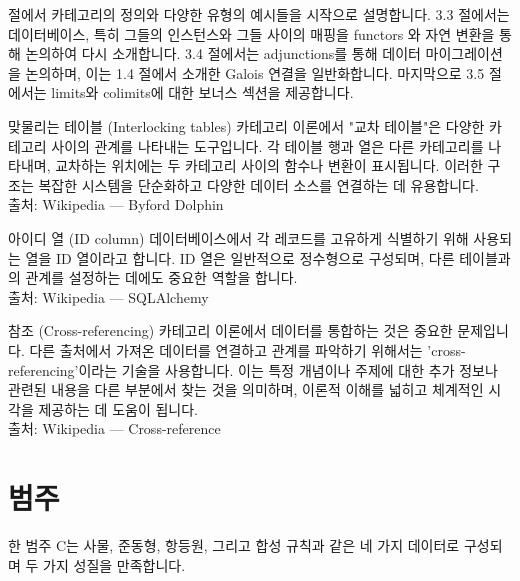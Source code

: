 \documentclass[11pt, a4paper, twoside, openany]{book}
\begin{document}
{\par{} 절에서 카테고리의 정의와 다양한 유형의 예시들을 시작으로 설명합니다. 3.3 절에서는 데이터베이스, 특히 그들의 인스턴스와 그들 사이의 매핑을 functors 와 자연 변환을 통해 논의하여 다시 소개합니다. 3.4 절에서는 adjunctions\hspace{0pt}를 통해 데이터 마이그레이션을 논의하며, 이는 1.4 절에서 소개한 Galois 연결을 일반화합니다. 마지막으로 3.5 절에서는 limits\hspace{0pt}와 colimits\hspace{0pt}에 대한 보너스 섹션을 제공합니다.

\begin{deepresearch}{맞물리는 테이블 (Interlocking tables)}
카테고리 이론에서 "교차 테이블"은 다양한 카테고리 사이의 관계를 나타내는 도구입니다. 각 테이블 행과 열은 다른 카테고리를 나타내며, 교차하는 위치에는 두 카테고리 사이의 함수나 변환이 표시됩니다. 이러한 구조는 복잡한 시스템을 단순화하고 다양한 데이터 소스를 연결하는 데 유용합니다.
\\[4pt]{\footnotesize\color{ctgray} 출처: Wikipedia — Byford Dolphin}
\end{deepresearch}

\begin{deepresearch}{아이디 열 (ID column)}
데이터베이스에서 각 레코드를 고유하게 식별하기 위해 사용되는 열을 ID 열이라고 합니다.  ID 열은 일반적으로 정수형으로 구성되며, 다른 테이블과의 관계를 설정하는 데에도 중요한 역할을 합니다.
\\[4pt]{\footnotesize\color{ctgray} 출처: Wikipedia — SQLAlchemy}
\end{deepresearch}

\begin{deepresearch}{참조 (Cross-referencing)}
카테고리 이론에서 데이터를 통합하는 것은 중요한 문제입니다.  다른 출처에서 가져온 데이터를 연결하고 관계를 파악하기 위해서는 'cross-referencing'이라는 기술을 사용합니다.  이는 특정 개념이나 주제에 대한 추가 정보나 관련된 내용을 다른 부분에서 찾는 것을 의미하며, 이론적 이해를 넓히고 체계적인 시각을 제공하는 데 도움이 됩니다.
\\[4pt]{\footnotesize\color{ctgray} 출처: Wikipedia — Cross-reference}
\end{deepresearch}


\section{범주}
\label{sec:3-2}

한 범주 C\hspace{0pt}는 사물, 준동형, 항등원, 그리고 합성 규칙과 같은 네 가지 데이터로 구성되며 두 가지 성질을 만족합니다.

}
\end{document}
